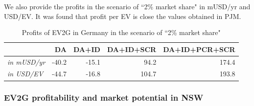 We also provide the profits in the scenario of ``2\% market share" in mUSD/yr and USD/EV. It was found that profit per EV is close the values obtained in PJM.

\begin{table}[h!]
	\footnotesize
	\centering
	\begin{tabular}{l r r r r}%
		\hline
		& DA & DA+ID & DA+ID+SCR & DA+ID+PCR+SCR \\
		\hline
		\textit{in mUSD/yr} &  -40.2& -15.1&	 94.2& 	 174.4\\
		\textit{in USD/EV} &  -44.7& 	 -16.8& 104.7&	 193.8\\ 
		\hline
	\end{tabular}
	\caption{Profits of EV2G in Germany in the scenario of ``2\% market share"}\label{tab:DE-EV-profit}
\end{table}


\subsubsection{EV2G profitability and market potential in NSW}



